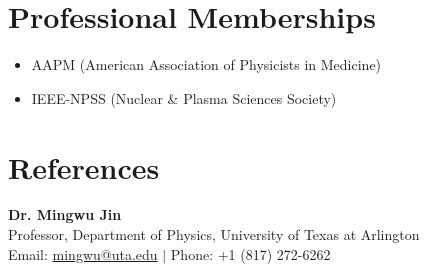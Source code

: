 \documentclass[11pt,letterpaper]{article}
\begin{document}
\section*{Professional Memberships}
\begin{itemize}[leftmargin=1.5em, itemsep=2pt]
    \item AAPM (American Association of Physicists in Medicine)
    \item IEEE-NPSS (Nuclear \& Plasma Sciences Society)
\end{itemize}

\section*{References}
\textbf{Dr. Mingwu Jin}\\
Professor, Department of Physics, University of Texas at Arlington\\
Email: \href{mailto:mingwu@uta.edu}{mingwu@uta.edu} $\vert{}$ Phone: +1 (817) 272-6262
\end{document}
